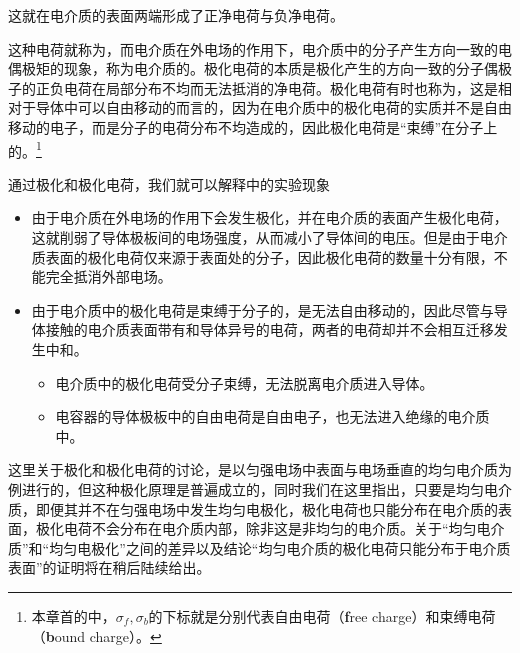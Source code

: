 这就在电介质的表面两端形成了正净电荷与负净电荷。

这种电荷就称为，而电介质在外电场的作用下，电介质中的分子产生方向一致的电偶极矩的现象，称为电介质的。极化电荷的本质是极化产生的方向一致的分子偶极子的正负电荷在局部分布不均而无法抵消的净电荷。极化电荷有时也称为，这是相对于导体中可以自由移动的而言的，因为在电介质中的极化电荷的实质并不是自由移动的电子，而是分子的电荷分布不均造成的，因此极化电荷是“束缚”在分子上的。\footnote{本章首的中，$\sigma_f,\sigma_b$的下标就是分别代表自由电荷（\textbf{f}ree charge）和束缚电荷（\textbf{b}ound charge）。}

通过极化和极化电荷，我们就可以解释中的实验现象
\begin{itemize}
    \item 由于电介质在外电场的作用下会发生极化，并在电介质的表面产生极化电荷，这就削弱了导体极板间的电场强度，从而减小了导体间的电压。但是由于电介质表面的极化电荷仅来源于表面处的分子，因此极化电荷的数量十分有限，不能完全抵消外部电场。
    \item 由于电介质中的极化电荷是束缚于分子的，是无法自由移动的，因此尽管与导体接触的电介质表面带有和导体异号的电荷，两者的电荷却并不会相互迁移发生中和。
    \begin{itemize}
        \item 电介质中的极化电荷受分子束缚，无法脱离电介质进入导体。
        \item 电容器的导体极板中的自由电荷是自由电子，也无法进入绝缘的电介质中。
    \end{itemize}
\end{itemize}
这里关于极化和极化电荷的讨论，是以匀强电场中表面与电场垂直的均匀电介质为例进行的，但这种极化原理是普遍成立的，同时我们在这里指出，只要是均匀电介质，即便其并不在匀强电场中发生均匀电极化，极化电荷也只能分布在电介质的表面，极化电荷不会分布在电介质内部，除非这是非均匀的电介质。关于“均匀电介质”和“均匀电极化”之间的差异以及结论“均匀电介质的极化电荷只能分布于电介质表面”的证明将在稍后陆续给出。


